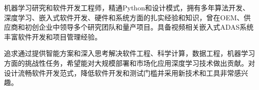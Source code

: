 \documentclass[../resume_cn.tex]{subfiles}
\begin{document}


\begin{cvparagraph}

机器学习研究和软件开发工程师，精通Python和设计模式，拥有多年算法开发、深度学习、嵌入式软件开发、硬件和系统方面的扎实经验和知识，曾在OEM、供应商和初创企业中领导多个研究团队和量产项目。具备视频相关嵌入式ADAS系统丰富软件开发和项目管理经验。

追求通过提供智能方案和深入思考解决软件工程、科学计算，数据工程，机器学习方面的挑战性任务，希望能对大规模部署和市场化应用深度学习技术做出贡献。对设计流畅软件开发范式，降低软件开发和测试门槛并采用新技术和工具非常感兴趣。

\end{cvparagraph}
\end{document}
